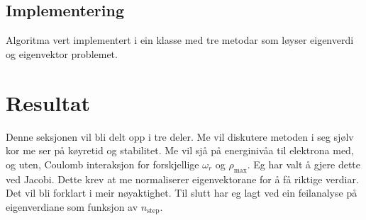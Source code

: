 \documentclass[11pt, a4paper]{article}
\begin{document}
  \subsection{Implementering}
    Algoritma vert implementert i ein klasse med tre metodar som løyser eigenverdi og eigenvektor problemet.



\section{Resultat}
  Denne seksjonen vil bli delt opp i tre deler. Me vil diskutere metoden i seg sjølv kor me ser på køyretid og stabilitet. %
  Me vil sjå på energinivåa til elektrona med, og uten, Coulomb interaksjon for forskjellige $\omega_r$ og $\rho_{\text{max}}$. Eg har valt å gjere dette 
  ved Jacobi. Dette krev at me normaliserer eigenvektorane for å få riktige verdiar. Det vil bli forklart i meir nøyaktighet. %
  Til slutt har eg lagt ved ein feilanalyse på eigenverdiane som funksjon av $n_{\text{step}}$.
\end{document}
